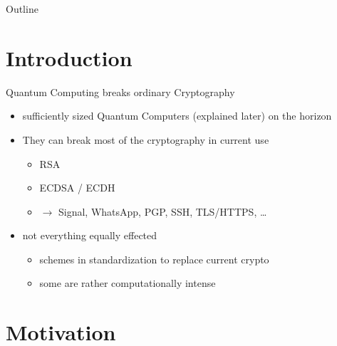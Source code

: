 \documentclass[ucs,10pt]{beamer}
\begin{document}
\begin{frame}[plain]
  \titlepage
\end{frame}

\begin{frame}{Outline}
  \tableofcontents[pausesections]
\end{frame}

\section{Introduction}

\begin{frame}{Quantum Computing breaks ordinary Cryptography}
  \begin{itemize}
  \item
    sufficiently sized Quantum Computers (explained later) on the horizon
  \item
    They can break most of the cryptography in current use
    \begin{itemize}
      \item RSA
      \item ECDSA / ECDH
      \item $\rightarrow$ Signal, WhatsApp, PGP, SSH, TLS/HTTPS, \dots
    \end{itemize}
  \item 
    not everything equally effected
    \begin{itemize}
      \item schemes in standardization to replace current crypto
      \item some are rather computationally intense
    \end{itemize}
  \end{itemize}
\end{frame}

\section{Motivation}
\end{document}
